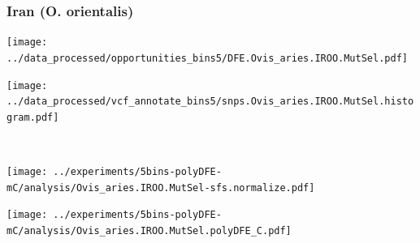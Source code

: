 \subsubsection{Iran (O. orientalis)}

\begin{minipage}{0.49\linewidth}
    \texttt{[image: ../data\_processed/opportunities\_bins5/DFE.Ovis\_aries.IROO.MutSel.pdf]}
\end{minipage}
\begin{minipage}{0.49\linewidth}
    \texttt{[image: ../data\_processed/vcf\_annotate\_bins5/snps.Ovis\_aries.IROO.MutSel.histogram.pdf]}
\end{minipage}
\\
\begin{minipage}{0.49\linewidth}
    \texttt{[image: ../experiments/5bins-polyDFE-mC/analysis/Ovis\_aries.IROO.MutSel-sfs.normalize.pdf]}
\end{minipage}
\begin{minipage}{0.4\linewidth}
    \texttt{[image: ../experiments/5bins-polyDFE-mC/analysis/Ovis\_aries.IROO.MutSel.polyDFE\_C.pdf]}
\end{minipage}
